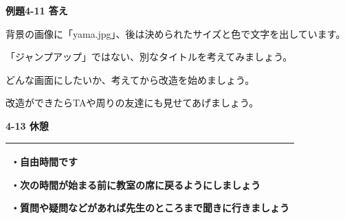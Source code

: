 \documentclass[a4paper,dvipdfmx]{jarticle}
\newcommand\textstyleqwerty[1]{#1}
\begin{document}
\bigskip


\bigskip


\bigskip


\bigskip


\bigskip


\bigskip


\bigskip


\bigskip


\bigskip


\bigskip


\bigskip


\bigskip


\bigskip


\bigskip


\bigskip


\bigskip


\bigskip


\bigskip

{\bfseries
例題4-11 答え}


\bigskip

背景の画像に「yama.jpg」、後は決められたサイズと色で文字を出しています。

\textstyleqwerty{「ジャンプアップ」ではない、別なタイトルを考えてみましょう。}

どんな画面にしたいか、考えてから改造を始めましょう。


\bigskip

\textstyleqwerty{改造ができたらTAや周りの友達にも見せてあげましょう。}


\bigskip


\bigskip


\bigskip


\bigskip


\bigskip


\bigskip

{\bfseries
4-13 休憩}


\bigskip

\begin{flushleft}
\tablefirsthead{}
\tablehead{}
\tabletail{}
\tablelasttail{}
\begin{supertabular}{|m{10.733cm}|}
\hline
・自由時間です

・次の時間が始まる前に教室の席に戻るようにしましょう

・質問や疑問などがあれば先生のところまで聞きに行きましょう\\\hline
\end{supertabular}
\end{flushleft}

\bigskip
\end{document}
